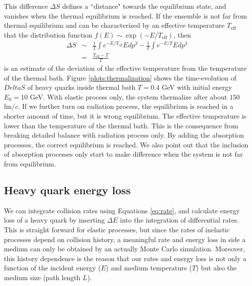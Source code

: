 \documentclass[aps, prc, reprint, amsmath, groupedaddress, nofootinbib]{revtex4-1}
\begin{document}
This difference $\Delta S$ defines a ``distance" towards the equilibrium state, and vanishes when the thermal equilibrium is reached.
If the ensemble is not far from thermal equilibrium and can be characterized by an effective temperature $T_{\textrm{eff}}$ that the distribution function $f(E)\sim \exp(-E/T_{\textrm{eff}})$, then
\begin{eqnarray}
\nonumber
\Delta S &\sim& \frac{1}{T}\int  e^{-E/T_{\textrm{eff}}} E dp^3 - \frac{1}{T}\int e^{-E/T} E dp^3 \\
&=& \frac{T_\textrm{eff}-T}{T}
\end{eqnarray}
is an estimate of the deviation of the effective temperature from the temperature of the thermal bath.
Figure \ref{plots:thermalization} shows the time-evolution of $Delta S$ of heavy quarks inside thermal bath $T=0.4$ GeV with initial energy $E_0 = 10$ GeV.
With elastic process only, the system thermalize after about $150$ fm/$c$.
If we further turn on radiation process, the equilibrium is reached in a shorter amount of time, but it is wrong equilibrium.
The effective temperature is lower than the temperature of the thermal bath.
This is the consequence from breaking detailed balance with radiation process only.
By adding the absorption processes, the correct equilibrium is reached.
We also point out that the inclusion of absorption processes only start to make difference when the system is not far from equilibrium.

\subsection{Heavy quark energy loss}
We can integrate collision rates using Equations \ref{eq:rate}, and calculate energy loss of a heavy quark by inserting $\Delta E$ into the integration of differential rates.
This is straight forward for elastic processes, but since the rates of inelastic processes depend on collision history, a meaningful rate and energy loss in side a medium can only be obtained by an actually Monte Carlo simulation.
Moreover, this history dependence is the reason that our rates and energy loss is not only a function of the incident energy ($E$) and medium temperature ($T$) but also the medium size (path length $L$).
\end{document}
